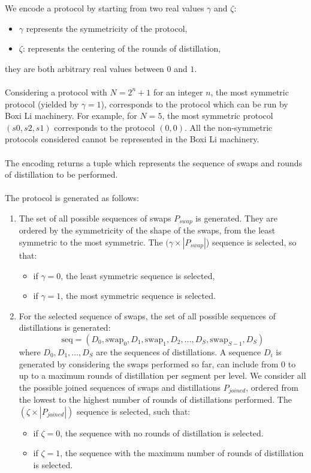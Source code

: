 \documentclass{article}
\begin{document}
We encode a protocol by starting from two real values $\gamma$ and $\zeta$:
\begin{itemize}
    \item \(\gamma\) represents the symmetricity of the protocol,
    \item \(\zeta\): represents the centering of the rounds of distillation,
\end{itemize}
they are both arbitrary real values between $0$ and $1$.
\\\\
Considering a protocol with $N=2^n+1$ for an integer $n$, the most symmetric protocol (yielded by \(\gamma=1\)), corresponds to the protocol which can be run by Boxi Li machinery.
For example, for $N=5$, the most symmetric protocol $(s0, s2, s1)$ corresponds to the protocol $(0,0)$.
All the non-symmetric protocols considered cannot be represented in the Boxi Li machinery.
\\\\
The encoding returns a tuple which represents the sequence of swaps and rounds of distillation to be performed.
\\\\
The protocol is generated as follows:
\begin{enumerate}
    \item The set of all possible sequences of swaps $P_{swap}$ is generated. 
    They are ordered by the symmetricity of the shape of the swaps, from the least symmetric to the most symmetric. The \((\gamma \times |P_{swap}|\)) sequence is selected, so that:
    \begin{itemize}
        \item if \(\gamma = 0\), the least symmetric sequence is selected,
        \item if \(\gamma = 1\), the most symmetric sequence is selected.
    \end{itemize}
    \item For the selected sequence of swaps, the set of all possible sequences of distillations is generated:
    \[
    \text{seq} = (D_0, \text{swap}_0, D_1, \text{swap}_1, D_2, \ldots, D_S, \text{swap}_{S-1}, D_S)
    \]
    where \(D_0, D_1, \ldots, D_S\) are the sequences of distillations. 
    A sequence $D_i$ is generated by considering the swaps performed so far, can include from $0$ to up to a maximum rounds of distillation per segment per level.
    We consider all the possible joined sequences of swaps and distillations $P_{joined}$, ordered from the lowest to the highest  number of rounds of distillations performed. 
    The \((\zeta \times |P_{joined}|)\) sequence is selected, such that:
    \begin{itemize}
        \item if \(\zeta = 0\), the sequence with no rounds of distillation is selected.
        \item if \(\zeta = 1\), the sequence with the maximum number of rounds of distillation is selected.
    \end{itemize}
\end{enumerate}
\end{document}
